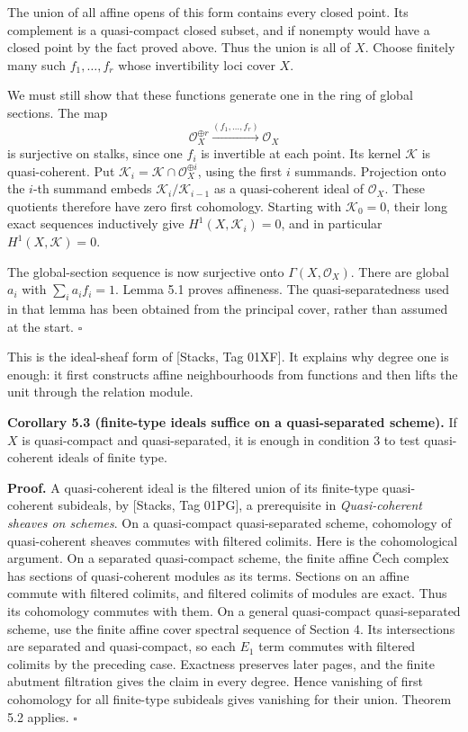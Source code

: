 \documentclass[11pt]{article}
\begin{document}
The union of all affine opens of this form contains every closed point.
Its complement is a quasi-compact closed subset, and if nonempty would
have a closed point by the fact proved above. Thus the union is all of
\(X\). Choose finitely many such \(f_1,\ldots,f_r\) whose invertibility
loci cover \(X\).

We must still show that these functions generate one in the ring of
global sections. The map \[
\mathcal O_X^{\oplus r}\xrightarrow{(f_1,\ldots,f_r)}\mathcal O_X
\] is surjective on stalks, since one \(f_i\) is invertible at each
point. Its kernel \(\mathcal K\) is quasi-coherent. Put
\(\mathcal K_i=\mathcal K\cap\mathcal O_X^{\oplus i}\), using the first
\(i\) summands. Projection onto the \(i\)-th summand embeds
\(\mathcal K_i/\mathcal K_{i-1}\) as a quasi-coherent ideal of
\(\mathcal O_X\). These quotients therefore have zero first cohomology.
Starting with \(\mathcal K_0=0\), their long exact sequences inductively
give \(H^1(X,\mathcal K_i)=0\), and in particular
\(H^1(X,\mathcal K)=0\).

The global-section sequence is now surjective onto
\(\Gamma(X,\mathcal O_X)\). There are global \(a_i\) with
\(\sum_i a_i f_i=1\). Lemma 5.1 proves affineness. The
quasi-separatedness used in that lemma has been obtained from the
principal cover, rather than assumed at the start. \(\square\)

This is the ideal-sheaf form of {[}Stacks, Tag 01XF{]}. It explains why
degree one is enough: it first constructs affine neighbourhoods from
functions and then lifts the unit through the relation module.

\textbf{Corollary 5.3 (finite-type ideals suffice on a quasi-separated
scheme).} If \(X\) is quasi-compact and quasi-separated, it is enough in
condition 3 to test quasi-coherent ideals of finite type.

\textbf{Proof.} A quasi-coherent ideal is the filtered union of its
finite-type quasi-coherent subideals, by {[}Stacks, Tag 01PG{]}, a
prerequisite in \emph{Quasi-coherent sheaves on schemes}. On a
quasi-compact quasi-separated scheme, cohomology of quasi-coherent
sheaves commutes with filtered colimits. Here is the cohomological
argument. On a separated quasi-compact scheme, the finite affine Čech
complex has sections of quasi-coherent modules as its terms. Sections on
an affine commute with filtered colimits, and filtered colimits of
modules are exact. Thus its cohomology commutes with them. On a general
quasi-compact quasi-separated scheme, use the finite affine cover
spectral sequence of Section 4. Its intersections are separated and
quasi-compact, so each \(E_1\) term commutes with filtered colimits by
the preceding case. Exactness preserves later pages, and the finite
abutment filtration gives the claim in every degree. Hence vanishing of
first cohomology for all finite-type subideals gives vanishing for their
union. Theorem 5.2 applies. \(\square\)
\end{document}
